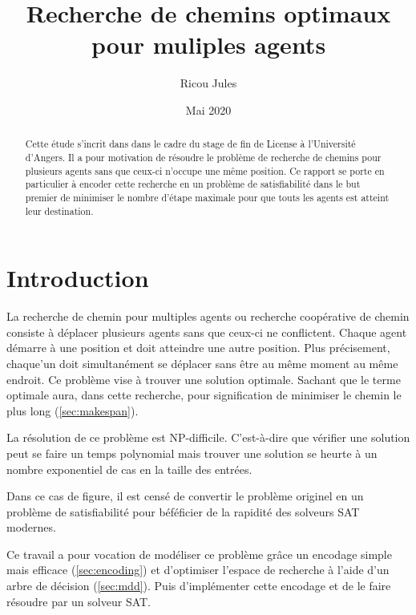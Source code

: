 \documentclass[french, 10pt, letterpaper]{article}
\title{Recherche de chemins optimaux pour muliples agents}
\author{Ricou Jules}
\date{Mai 2020}
\theoremstyle{definition}
\theoremstyle{proposition}
\theoremstyle{example}
\begin{document}
    \maketitle

    \begin{abstract}
        Cette étude s'incrit dans dans le cadre du stage de fin de License à l'Université d'Angers. 
        Il a pour motivation de résoudre le problème de recherche de chemins pour plusieurs agents sans
        que ceux-ci n'occupe une même position.
        Ce rapport se porte en particulier à encoder cette recherche en un problème de satisfiabilité
        dans le but premier de minimiser le nombre d'étape maximale pour que touts les agents est atteint leur destination.
    \end{abstract}

    \newpage

    \tableofcontents

    \newpage
    \section{Introduction}

    La recherche de chemin pour multiples agents ou recherche coopérative de chemin consiste à déplacer plusieurs agents sans que ceux-ci ne conflictent.
    Chaque agent démarre à une position et doit atteindre une autre position. 
    Plus précisement, chaque'un doit simultanément se déplacer sans être au même moment au même endroit.
    Ce problème vise à trouver une solution optimale.
    Sachant que le terme optimale aura, dans cette recherche, pour signification de minimiser le chemin
    le plus long (\ref{sec:makespan}).

    La résolution de ce problème est NP-difficile. 
    C'est-à-dire que vérifier une solution peut se faire un temps polynomial mais trouver une solution se heurte à un nombre exponentiel
    de cas en la taille des entrées.

    Dans ce cas de figure, il est censé de convertir le problème originel en un problème de satisfiabilité
    pour béféficier de la rapidité des solveurs SAT modernes. 

    Ce travail a pour vocation de modéliser ce problème grâce un encodage simple mais efficace \cite{PSUR16} (\ref{sec:encoding})
    et d'optimiser l'espace de recherche à l'aide d'un arbre de décision (\ref{sec:mdd}).
    Puis d'implémenter cette encodage et de le faire résoudre par un solveur SAT.
\end{document}
